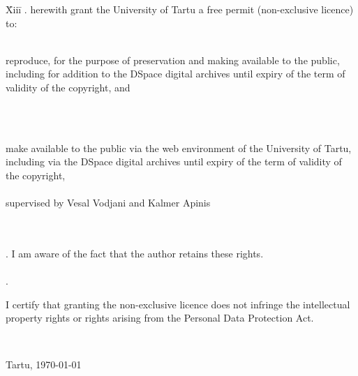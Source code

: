 \documentclass{style/master-thesis}
\begin{document}
\begin{tabbing}
\= Xiii\=\kill
{}. \> herewith grant the University of Tartu a free permit (non-exclusive licence) to:\\\\ 

\> 
\begin{minipage}[t]{14.2cm}
reproduce, for the purpose of preservation and making available to the public, including for addition to the DSpace digital archives until expiry of the term of validity of the copyright, and
\end{minipage}
\\\\
\begin{minipage}[t]{14.2cm}
make available to the public via the web environment of the University of Tartu, including via the DSpace digital archives until expiry of the term of validity of the copyright,\\ 

\articleName\\   

supervised by Vesal Vodjani and Kalmer Apinis

\end{minipage}\\\\ 
. \>I am aware of the fact that the author retains these rights.\\\\
. \>
\begin{minipage}[t]{14.2cm}
I certify that granting the non-exclusive licence does not infringe the intellectual property rights or rights arising from the Personal Data Protection Act. 
\end{minipage}\\
\end{tabbing}

\noindent
Tartu, \today
\end{document}
